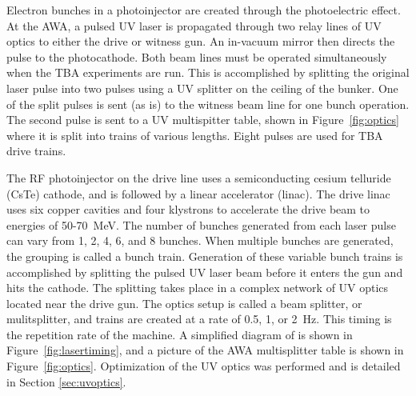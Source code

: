 Electron bunches in a photoinjector are created through the photoelectric effect. 
At the AWA, a pulsed UV laser is propagated through two relay lines of UV optics to either
the drive or witness gun. An in-vacuum mirror then directs the pulse to the photocathode.
Both beam lines must be operated simultaneously when the TBA experiments are run. This is accomplished by
splitting the original laser pulse into two pulses using a UV splitter on the 
ceiling of the bunker. One of the split pulses is sent (as is) to the witness beam line for one
bunch operation. The second pulse is sent to a UV multispitter table, shown in 
Figure~\ref{fig:optics} where it is split into trains of various lengths. Eight pulses are 
used for TBA drive trains.

The RF photoinjector on the drive line uses a semiconducting
cesium telluride (CsTe) cathode, and is followed by a linear accelerator (linac). The
drive linac uses six copper cavities and four klystrons to accelerate the drive beam
to energies of 50-\SI{70}{MeV}. The number of bunches generated from each 
laser pulse can vary from 1, 2, 4, 6, and 8 bunches. When multiple bunches
are generated, the grouping is called a bunch train. Generation of
these variable bunch trains is accomplished by splitting the pulsed
UV laser beam before it enters the gun and hits the cathode. The splitting
takes place in a complex network of UV optics located near the drive
gun. The optics setup is called a beam splitter, or mulitsplitter,
and trains are created at a rate of 0.5, 1, or \SI{2}{Hz}. 
This timing is the repetition rate of the machine. 
A simplified diagram of  is shown in Figure~\ref{fig:lasertiming}, 
and a picture of the AWA multisplitter table is shown in Figure~\ref{fig:optics}. 
Optimization of the UV optics was performed and is detailed in Section \ref{sec:uvoptics}.  
